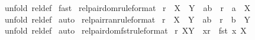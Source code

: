 \begin{isabellebody}
%
\isadelimproof
%
\endisadelimproof
%
\isatagproof
{}\isamarkupfalse%
\ {\isacharparenleft}unfold\ rel{\isacharunderscore}def{\isacharparenright}\isanewline
{}\isamarkupfalse%
\ fast\isanewline
{}\isamarkupfalse%
%
\endisatagproof
{\isafoldproof}%
%
\isadelimproof
\isanewline
%
\endisadelimproof
\isanewline
\isanewline
{}\isamarkupfalse%
\ rel{\isacharunderscore}pair{\isacharunderscore}dom{\isacharbrackleft}rule{\isacharunderscore}format{\isacharbrackright}{\isacharcolon}\ \isanewline
{\isachardoublequoteopen}r\ {\isacharcolon}\ {\isacharparenleft}X\ {\isacharless}{\isacharminus}{\isacharminus}{\isachargreater}\ Y{\isacharparenright}\ {\isacharminus}{\isacharminus}{\isachargreater}\ {\isacharparenleft}a{\isacharcomma}b{\isacharparenright}\ {\isacharcolon}\ r\ {\isacharminus}{\isacharminus}{\isachargreater}\ a\ {\isacharcolon}\ X{\isachardoublequoteclose}\isanewline
%
\isadelimproof
%
\endisadelimproof
%
\isatagproof
{}\isamarkupfalse%
\ {\isacharparenleft}unfold\ rel{\isacharunderscore}def{\isacharparenright}\isanewline
{}\isamarkupfalse%
\ auto\isanewline
{}\isamarkupfalse%
%
\endisatagproof
{\isafoldproof}%
%
\isadelimproof
\isanewline
%
\endisadelimproof
\isanewline
{}\isamarkupfalse%
\ rel{\isacharunderscore}pair{\isacharunderscore}ran{\isacharbrackleft}rule{\isacharunderscore}format{\isacharbrackright}{\isacharcolon}\ \isanewline
{\isachardoublequoteopen}r\ {\isacharcolon}\ {\isacharparenleft}X\ {\isacharless}{\isacharminus}{\isacharminus}{\isachargreater}\ Y{\isacharparenright}\ {\isacharminus}{\isacharminus}{\isachargreater}\ {\isacharparenleft}a{\isacharcomma}b{\isacharparenright}\ {\isacharcolon}\ r\ {\isacharminus}{\isacharminus}{\isachargreater}\ b\ {\isacharcolon}\ Y{\isachardoublequoteclose}\isanewline
%
\isadelimproof
%
\endisadelimproof
%
\isatagproof
{}\isamarkupfalse%
\ {\isacharparenleft}unfold\ rel{\isacharunderscore}def{\isacharparenright}\isanewline
{}\isamarkupfalse%
\ auto\isanewline
{}\isamarkupfalse%
%
\endisatagproof
{\isafoldproof}%
%
\isadelimproof
\isanewline
%
\endisadelimproof
\isanewline
{}\isamarkupfalse%
\ rel{\isacharunderscore}pair{\isacharunderscore}dom{\isacharunderscore}fst{\isacharbrackleft}rule{\isacharunderscore}format{\isacharbrackright}{\isacharcolon}\ \isanewline
{\isachardoublequoteopen}r\ {\isacharcolon}{\isacharparenleft}X{\isacharless}{\isacharminus}{\isacharminus}{\isachargreater}Y{\isacharparenright}\ {\isacharminus}{\isacharminus}{\isachargreater}\ {\isacharparenleft}x{\isacharcolon}r{\isacharparenright}\ {\isacharminus}{\isacharminus}{\isachargreater}\ fst\ x{\isacharcolon}\ X{\isachardoublequoteclose}\isanewline

\end{isabellebody}
